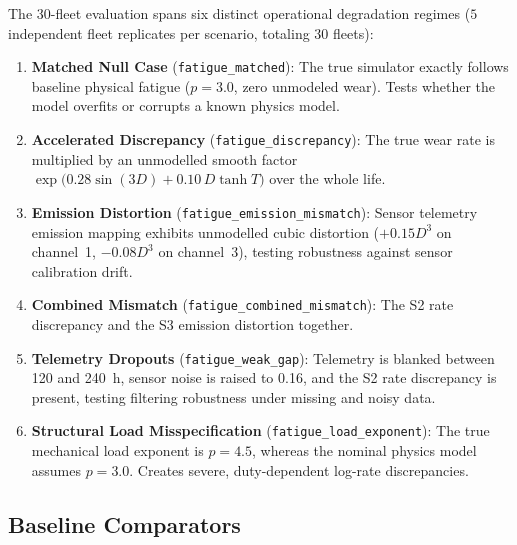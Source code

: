 \documentclass[a4paper,fleqn]{cas-dc}
\begin{document}
The 30-fleet evaluation spans six distinct operational degradation regimes ($5$ independent fleet replicates per scenario, totaling $30$ fleets):
\begin{enumerate}[label=\textbf{S\arabic*.},leftmargin=2.2em]
    \item \textbf{Matched Null Case} (\texttt{fatigue\_matched}): The true simulator exactly follows baseline physical fatigue ($p = 3.0$, zero unmodeled wear). Tests whether the model overfits or corrupts a known physics model.
    \item \textbf{Accelerated Discrepancy} (\texttt{fatigue\_discrepancy}): The true wear rate is multiplied by an unmodelled smooth factor $\exp\bigl(0.28\sin(3D) + 0.10\,D\tanh T\bigr)$ over the whole life.
    \item \textbf{Emission Distortion} (\texttt{fatigue\_emission\_mismatch}): Sensor telemetry emission mapping exhibits unmodelled cubic distortion ($+0.15D^3$ on channel~1, $-0.08D^3$ on channel~3), testing robustness against sensor calibration drift.
    \item \textbf{Combined Mismatch} (\texttt{fatigue\_combined\_mismatch}): The S2 rate discrepancy and the S3 emission distortion together.
    \item \textbf{Telemetry Dropouts} (\texttt{fatigue\_weak\_gap}): Telemetry is blanked between 120 and 240~h, sensor noise is raised to 0.16, and the S2 rate discrepancy is present, testing filtering robustness under missing and noisy data.
    \item \textbf{Structural Load Misspecification} (\texttt{fatigue\_load\_exponent}): The true mechanical load exponent is $p = 4.5$, whereas the nominal physics model assumes $p = 3.0$. Creates severe, duty-dependent log-rate discrepancies.
\end{enumerate}

\subsection{Baseline Comparators}
\label{subsec:baselines}
\end{document}
